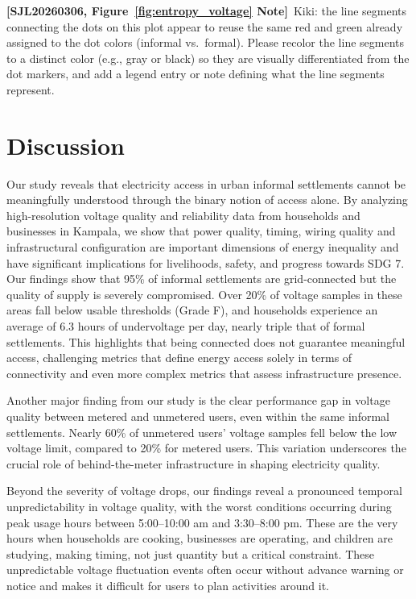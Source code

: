 \documentclass[review]{elsarticle}
\begin{document}
{\color{sjlmutedblue}\textbf{[SJL20260306, Figure~\ref{fig:entropy_voltage} Note]}\ Kiki: the line segments connecting the dots on this plot appear to reuse the same red and green already assigned to the dot colors (informal vs.\ formal). Please recolor the line segments to a distinct color (e.g., gray or black) so they are visually differentiated from the dot markers, and add a legend entry or note defining what the line segments represent.}


\section{Discussion}

Our study reveals that electricity access in urban informal settlements cannot be meaningfully understood through the binary notion of access alone. By analyzing high-resolution voltage quality and reliability data from households and businesses in Kampala, we show that power quality, timing, wiring quality and infrastructural configuration are important dimensions of energy inequality and have significant implications for livelihoods, safety, and progress towards SDG 7.
Our findings show that 95\% of informal settlements are grid-connected but the quality of supply is severely compromised. Over 20\% of voltage samples in these areas fall below usable thresholds (Grade F), and households experience an average of 6.3 hours of undervoltage per day, nearly triple that of formal settlements. This highlights that being connected does not guarantee meaningful access, challenging metrics that define energy access solely in terms of connectivity and even more complex metrics that assess infrastructure presence.

Another major finding from our study is the clear performance gap in voltage quality between metered and unmetered users, even within the same informal settlements. Nearly 60\% of unmetered users’ voltage samples fell below the low voltage limit, compared to 20\% for metered users. This variation underscores the crucial role of behind-the-meter infrastructure in shaping electricity quality.

Beyond the severity of voltage drops, our findings reveal a pronounced temporal unpredictability in voltage quality, with the worst conditions occurring during peak usage hours between 5:00–10:00 am and 3:30–8:00 pm. These are the very hours when households are cooking, businesses are operating, and children are studying, making timing, not just quantity but a critical constraint. These unpredictable voltage fluctuation events often occur without advance warning or notice and makes it difficult for users to plan activities around it.
\end{document}
